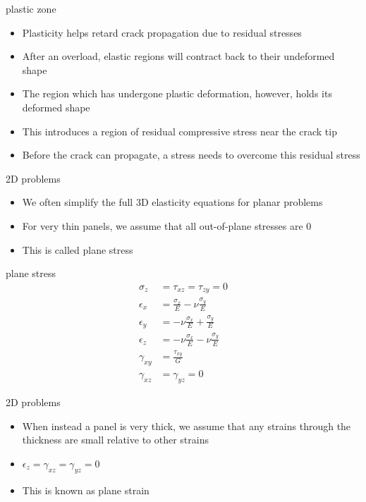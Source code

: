 \documentclass[
  letterpaper,
  ignorenonframetext,
  aspectratio=43,
  handout,
  12pt]{beamer}
\providecommand{\tightlist}{%
  \setlength{\itemsep}{0pt}\setlength{\parskip}{0pt}}
\providecommand{\tightlist}{%
\setlength{\itemsep}{0pt}\setlength{\parskip}{0pt}}
\begin{document}
\begin{frame}{plastic zone}
\protect\hypertarget{plastic-zone-2}{}
\begin{itemize}
\tightlist
\item
  Plasticity helps retard crack propagation due to residual stresses
\item
  After an overload, elastic regions will contract back to their
  undeformed shape
\item
  The region which has undergone plastic deformation, however, holds its
  deformed shape
\item
  This introduces a region of residual compressive stress near the crack
  tip
\item
  Before the crack can propagate, a stress needs to overcome this
  residual stress
\end{itemize}
\end{frame}

\begin{frame}{2D problems}
\protect\hypertarget{d-problems}{}
\begin{itemize}
\tightlist
\item
  We often simplify the full 3D elasticity equations for planar problems
\item
  For very thin panels, we assume that all out-of-plane stresses are 0
\item
  This is called plane stress
\end{itemize}
\end{frame}

\begin{frame}{plane stress}
\protect\hypertarget{plane-stress}{}
\[\begin{aligned}
  \sigma_z &= \tau_{xz} = \tau_{zy} = 0\\
  \epsilon_x &= \frac{\sigma_x}{E} - \nu \frac{\sigma_y}{E}\\
  \epsilon_y &= -\nu \frac{\sigma_x}{E} + \frac{\sigma_y}{E}\\
  \epsilon_z &= -\nu \frac{\sigma_x}{E} - \nu \frac{\sigma_y}{E}\\
  \gamma_{xy} &= \frac{\tau_{xy}}{G}\\
  \gamma_{xz} &= \gamma_{yz} = 0
\end{aligned}\]
\end{frame}

\begin{frame}{2D problems}
\protect\hypertarget{d-problems-1}{}
\begin{itemize}
\tightlist
\item
  When instead a panel is very thick, we assume that any strains through
  the thickness are small relative to other strains
\item
  \(\epsilon_z = \gamma_{xz} = \gamma_{yz} = 0\)
\item
  This is known as plane strain
\end{itemize}
\end{frame}
\end{document}
